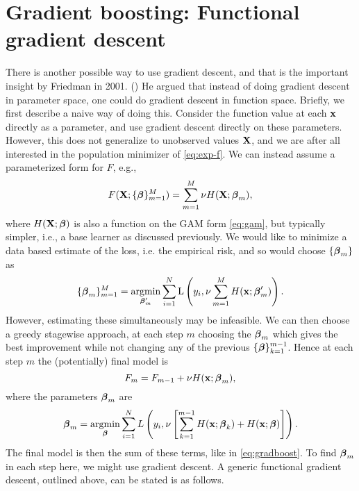 \section{Gradient boosting: Functional gradient descent}
There is another possible way to use gradient descent, and that is the important insight by Friedman in 2001. (\cite{friedman2001}) He argued that instead of doing gradient descent in parameter space, one could do gradient descent in function space. Briefly, we first describe a naive way of doing this. Consider the function value at each $\mathbf{x}$ directly as a parameter, and use gradient descent directly on these parameters. However, this does not generalize to unobserved values $\mathbf{X}$, and we are after all interested in the population minimizer of \eqref{eq:exp-f}. We can instead assume a parameterized form for $F$, e.g.,
\begin{equation}\label{eq:gradboost}
    F(\mathbf{X};\{\boldsymbol{\beta}\}_{m=1}^M)=\sum_{m=1}^M\nu H(\mathbf{X};\boldsymbol{\beta}_m),
\end{equation}
where $H(\mathbf{X};\boldsymbol{\beta})$ is also a function on the GAM form \eqref{eq:gam}, but typically simpler, i.e., a base learner as discussed previously. We would like to minimize a data based estimate of the loss, i.e. the empirical risk, and so would choose $\{\boldsymbol{\beta}_m\}$ as
\begin{equation}
    \{\boldsymbol{\beta}_m\}_{m=1}^M=\operatorname*{argmin}_{\boldsymbol{\beta}_m^\prime}\sum_{i=1}^N\operatorname{L}\left(y_i,\nu\sum_{m=1}^MH(\mathbf{x};\boldsymbol{\beta}_m^\prime)\right).
\end{equation}
However, estimating these simultaneously may be infeasible. We can then choose a greedy stagewise approach, at each step $m$ choosing the $\boldsymbol{\beta}_m$ which gives the best improvement while not changing any of the previous $\{\boldsymbol{\beta}\}_{k=1}^{m-1}$. Hence at each step $m$ the (potentially) final model is
\begin{equation}
    F_{m}=F_{m-1}+\nu H(\mathbf{x};\boldsymbol{\beta}_m),
\end{equation}
where the parameters $\boldsymbol{\beta}_m$ are
\begin{equation}
    \boldsymbol{\beta}_m=\operatorname*{argmin}_{\boldsymbol{\beta}}\sum_{i=1}^NL\left(y_i,\nu\left[\sum_{k=1}^{m-1}H(\mathbf{x};\boldsymbol{\beta}_k)+H(\mathbf{x};\boldsymbol{\beta})\right]\right).
\end{equation}
The final model is then the sum of these terms, like in \eqref{eq:gradboost}. To find $\boldsymbol{\beta}_m$ in each step here, we might use gradient descent. A generic functional gradient descent, outlined above, can be stated is as follows.
